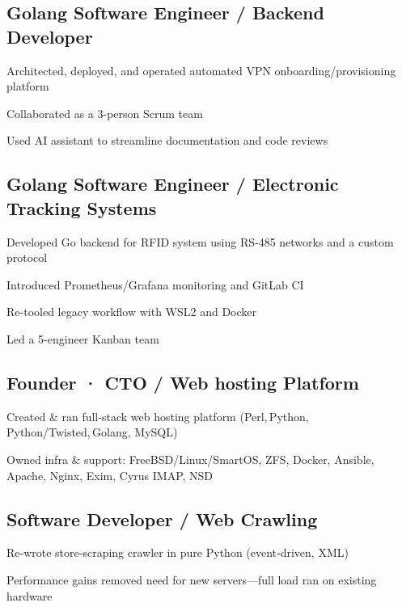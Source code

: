 \documentclass[letter,10pt]{article}
\begin{document}
\subsection{Golang Software Engineer / Backend Developer}
\begin{zitemize}
        \item Architected, deployed, and operated automated VPN onboarding/provisioning platform
        \item Collaborated as a 3-person Scrum team
        \item Used AI assistant to streamline documentation and code reviews
\end{zitemize}

\subsection{Golang Software Engineer / Electronic Tracking Systems}
\begin{zitemize}
        \item Developed Go backend for RFID system using RS‑485 networks and a custom protocol
        \item Introduced Prometheus/Grafana monitoring and GitLab CI
        \item Re-tooled legacy workflow with WSL2 and Docker
        \item Led a 5-engineer Kanban team
\end{zitemize}

\subsection{Founder · CTO / Web hosting Platform}
\begin{zitemize}
        \item Created \& ran full‑stack web hosting platform (Perl, Python, Python/Twisted, Golang, MySQL)
        \item Owned infra \& support: FreeBSD/Linux/SmartOS, ZFS, Docker, Ansible, Apache, Nginx, Exim, Cyrus IMAP, NSD
\end{zitemize}

\subsection{Software Developer / Web Crawling}
\begin{zitemize}
        \item Re‑wrote store‑scraping crawler in pure Python (event‑driven, XML)
        \item Performance gains removed need for new servers—full load ran on existing hardware
\end{zitemize}
\end{document}
